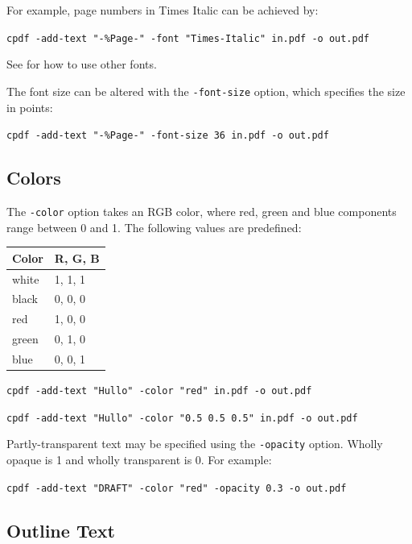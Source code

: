 \documentclass[a4paper,makeidx]{memoir}
\begin{document}
  \noindent For example, page numbers in Times Italic can be achieved by:
  \begin{framed}
    \small\verb!cpdf -add-text "-%Page-" -font "Times-Italic" in.pdf -o out.pdf!
  \end{framed}
  \noindent See  for how to use other fonts.

  The font size can be altered with the \texttt{-font-size} option, which
specifies the size in points:
  \begin{framed}
    \small\verb!cpdf -add-text "-%Page-" -font-size 36 in.pdf -o out.pdf!
  \end{framed}

  \subsection{Colors}
  The \texttt{-color} option takes an RGB color, where red, green and blue
components range between 0 and 1. The following values are predefined:

  \vspace{2mm}
  \begin{tabular}{ll}
    \textbf{Color} & \textbf{R, G, B} \\ \hline
     white & 1, 1, 1\\
     black & 0, 0, 0\\
     red & 1, 0, 0\\
     green & 0, 1, 0\\
     blue & 0, 0, 1\\
  \end{tabular}

  \begin{framed}
    \small\verb!cpdf -add-text "Hullo" -color "red" in.pdf -o out.pdf!
    
    \vspace{1.5mm}
    \small\verb!cpdf -add-text "Hullo" -color "0.5 0.5 0.5" in.pdf -o out.pdf!
  \end{framed}

\noindent Partly-transparent text may be specified using the \verb!-opacity! option. Wholly opaque is 1 and wholly transparent is 0. For example:

\begin{framed}
  \small\verb!cpdf -add-text "DRAFT" -color "red" -opacity 0.3 -o out.pdf!
\end{framed}

\subsection{Outline Text}
\end{document}
